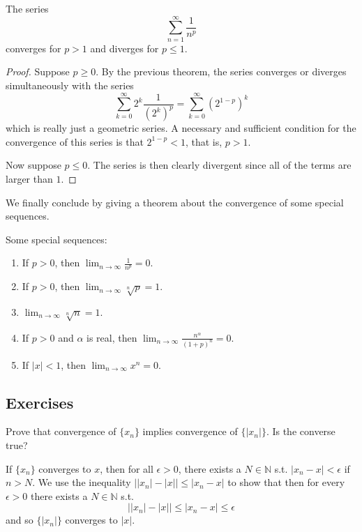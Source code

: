     \begin{corollary}
    The series 
    \[\sum_{n=1}^\infty \frac{1}{n^p}\]
    converges for $p>1$ and diverges for $p \leq 1$. 
    \end{corollary}
    \begin{proof}
    Suppose $p\geq 0$. By the previous theorem, the series converges or diverges simultaneously with the series 
    \[\sum_{k=0}^\infty 2^k \frac{1}{(2^k)^p} = \sum_{k=0}^\infty (2^{1-p})^k\]
    which is really just a geometric series. A necessary and sufficient condition for the convergence of this series is that $2^{1-p} < 1$, that is, $p>1$. 

    Now suppose $p \leq 0$. The series is then clearly divergent since all of the terms are larger than $1$. 
    \end{proof}

    We finally conclude by giving a theorem about the convergence of some special sequences. 

    \begin{theorem}
      Some special sequences: 
      \begin{enumerate}
        \item If $p > 0$, then $\lim_{n \rightarrow \infty} \frac{1}{n^p} = 0$. 
        
        \item If $p > 0$, then $\lim_{n \rightarrow \infty} \sqrt[n]{p} = 1$. 

        \item $\lim_{n \rightarrow \infty} \sqrt[n]{n} = 1$. 

        \item If $p > 0$ and $\alpha$ is real, then $\lim_{n \rightarrow \infty} \frac{n^\alpha}{(1 + p)^n} = 0$. 
        
        \item If $|x| < 1$, then $\lim_{n \rightarrow \infty} x^n = 0$. 
      \end{enumerate}
    \end{theorem}

  \subsection{Exercises}

    \begin{exercise}
    Prove that convergence of $\{x_n\}$ implies convergence of $\{|x_n|\}$. Is the converse true? 
    \end{exercise}
    \begin{solution}
    If $\{x_n\}$ converges to $x$, then for all $\epsilon > 0$, there exists a $N \in \mathbb{N}$ s.t. $|x_n - x| < \epsilon$ if $n > N$. We use the inequality $\big| |x_n| - |x| \big| \leq |x_n - x|$ to show that then for every $\epsilon > 0$ there exists a $N \in \mathbb{N}$ s.t. 
    \[ \big| |x_n| - |x| \big| \leq |x_n - x| \leq \epsilon \]
    and so $\{|x_n|\}$ converges to $|x|$. 
    \end{solution}

